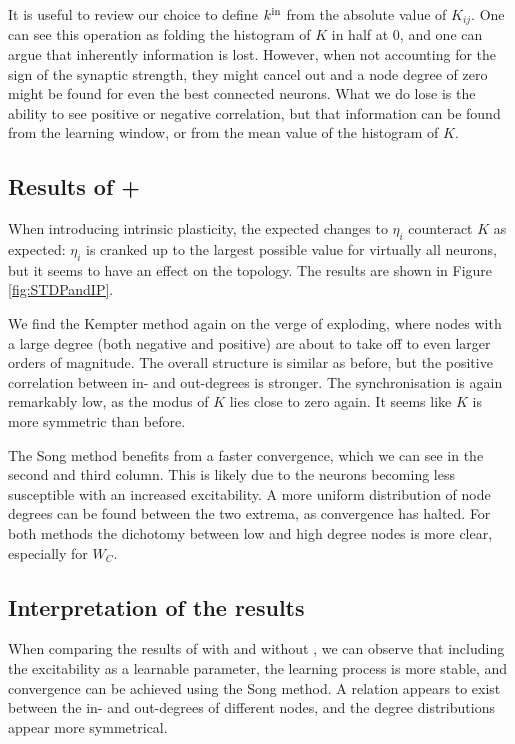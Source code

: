 It is useful to review our choice to define ${k^{\rm in}}$ from the absolute value of $K_{ij}$. One can see this operation as folding the histogram of $K$ in half at 0, and one can argue that inherently information is lost. However, when not accounting for the sign of the synaptic strength, they might cancel out and a node degree of zero might be found for even the best connected neurons. What we do lose is the ability to see positive or negative correlation, but that information can be found from the learning window, or from the mean value of the histogram of $K$.


\subsection{Results of \STDP + \IP}
When introducing intrinsic plasticity, the expected changes to $\eta_i$ counteract $K$ as expected: $\eta_i$ is cranked up to the largest possible value for virtually all neurons, but it seems to have an effect on the topology. The results are shown in Figure \ref{fig:STDPandIP}. 

We find the Kempter method again on the verge of exploding, where nodes with a large degree (both negative and positive) are about to take off to even larger orders of magnitude. The overall structure is similar as before, but the positive correlation between in- and out-degrees is stronger. The synchronisation is again remarkably low, as the modus of $K$ lies close to zero again. It seems like $K$ is more symmetric than before.

The Song method benefits from a faster convergence, which we can see in the second and third column. This is likely due to the neurons becoming less susceptible with an increased excitability. A more uniform distribution of node degrees can be found between the two extrema, as convergence has halted. For both methods the dichotomy between low and high degree nodes is more clear, especially for $W_C$.

\subsection{Interpretation of the results}
When comparing the results of \STDP with and without \IP, we can observe that including the excitability as a learnable parameter, the learning process is more stable, and convergence can be achieved using the Song method. A relation appears to exist between the in- and out-degrees of different nodes, and the degree distributions appear more symmetrical.

